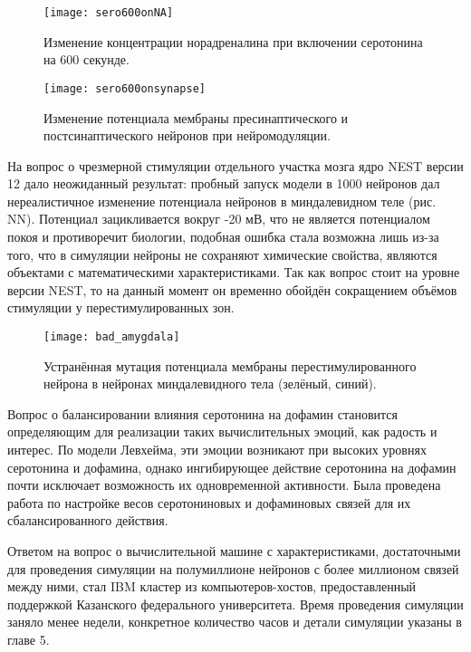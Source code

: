 \begin{figure}
	\centering
	\texttt{[image: sero600onNA]}
	\caption{Изменение концентрации норадреналина при включении серотонина на 600 секунде.}
	\label{fig:sero600onNA}
\end{figure}

\begin{figure}
	\centering
	\texttt{[image: sero600onsynapse]}
	\caption{Изменение потенциала мембраны пресинаптического и постсинаптического нейронов при нейромодуляции.}
	\label{fig:sero600onsynapse}
\end{figure}

На вопрос о чрезмерной стимуляции отдельного участка мозга ядро NEST версии 12 дало неожиданный результат: пробный запуск модели в 1000 нейронов дал нереалистичное изменение потенциала нейронов в миндалевидном теле (рис. NN). Потенциал зацикливается вокруг -20 мВ, что не является потенциалом покоя и противоречит биологии, подобная ошибка стала возможна лишь из-за того, что в симуляции нейроны не сохраняют химические свойства, являются объектами с математическими характеристиками. Так как вопрос стоит на уровне версии NEST, то на данный момент он временно обойдён сокращением объёмов стимуляции у перестимулированных зон.


\begin{figure}
	\centering
	\texttt{[image: bad\_amygdala]}
	\caption{Устранённая мутация потенциала мембраны перестимулированного нейрона в нейронах миндалевидного тела (зелёный, синий).}
	\label{fig:bad_amygdala}
\end{figure}

Вопрос о балансировании влияния серотонина на дофамин становится определяющим для реализации таких вычислительных эмоций, как радость и интерес. По модели Левхейма, эти эмоции возникают при высоких уровнях серотонина и дофамина, однако ингибирующее действие серотонина на дофамин почти исключает возможность их одновременной активности. Была проведена работа по настройке весов серотониновых и дофаминовых связей для их сбалансированного действия.


Ответом на вопрос о вычислительной машине с характеристиками, достаточными для проведения симуляции на полумиллионе нейронов с более миллионом связей между ними, стал IBM кластер из компьютеров-хостов, предоставленный поддержкой Казанского федерального университета. Время проведения симуляции заняло менее недели, конкретное количество часов и детали симуляции указаны в главе 5.